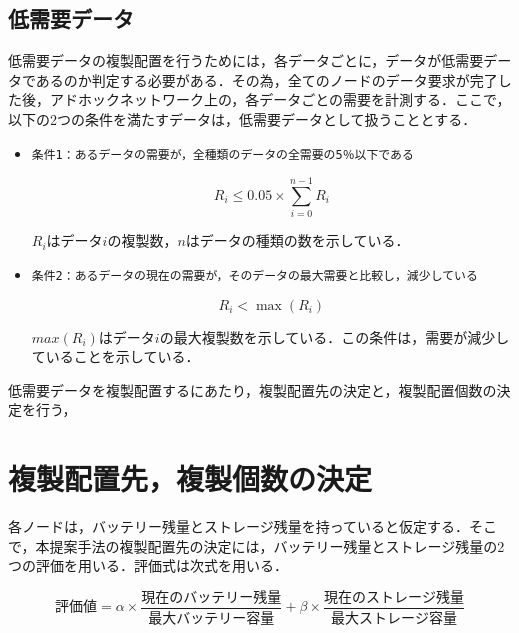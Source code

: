 \documentclass[11pt]{jreport}
\begin{document}
\subsection{低需要データ}
低需要データの複製配置を行うためには，各データごとに，データが低需要データであるのか判定する必要がある．その為，全てのノードのデータ要求が完了した後，アドホックネットワーク上の，各データごとの需要を計測する．ここで，以下の2つの条件を満たすデータは，低需要データとして扱うこととする．

\begin{itemize}
	\item {\tt 条件1：あるデータの需要が，全種類のデータの全需要の5％以下である}
	
	\begin{equation}
	R_i \le 0.05 \times \sum_{i=0}^{n-1} R_i
	\end{equation}
	
	$R_i$はデータ$i$の複製数，$n$はデータの種類の数を示している．
	\item {\tt 条件2：あるデータの現在の需要が，そのデータの最大需要と比較し，減少している}
	
	\begin{equation}
	R_i < \max{(R_i)}
	\end{equation}	
	
	$max(R_i)$はデータ$i$の最大複製数を示している．この条件は，需要が減少していることを示している．
\end{itemize}

\par 低需要データを複製配置するにあたり，複製配置先の決定と，複製配置個数の決定を行う，

\section{複製配置先，複製個数の決定}
各ノードは，バッテリー残量とストレージ残量を持っていると仮定する．そこで，本提案手法の複製配置先の決定には，バッテリー残量とストレージ残量の2つの評価を用いる．評価式は次式を用いる．

\begin{equation}
評価値 = \alpha \times \frac{現在のバッテリー残量}{最大バッテリー容量} + \beta \times \frac{現在のストレージ残量}{最大ストレージ容量} 
\end{equation}
\end{document}
